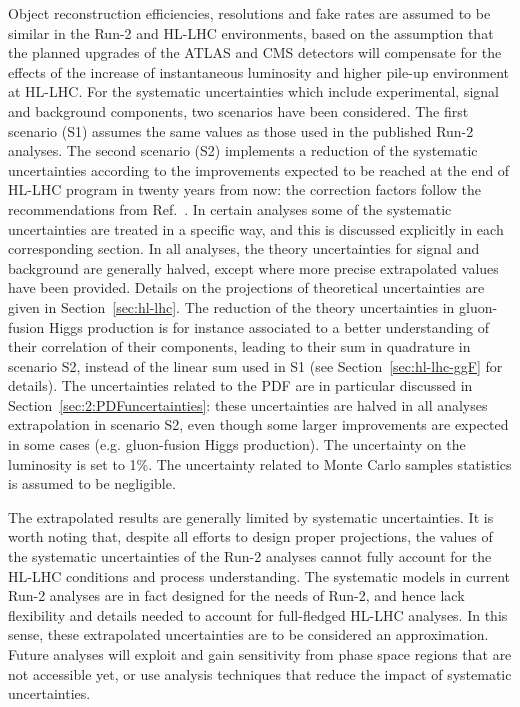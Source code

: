 Object reconstruction efficiencies, resolutions and fake rates are assumed to be similar in the Run-2 and HL-LHC environments, based on the assumption that the planned upgrades of the ATLAS and CMS detectors will compensate for the effects of the increase of instantaneous luminosity and higher pile-up environment at HL-LHC.
For the systematic uncertainties which include experimental, signal and background components, two scenarios have been considered.
The first scenario (S1) assumes the same values as those used in the published Run-2 analyses.
The second scenario (S2) implements a reduction of the systematic uncertainties according to the improvements expected to be reached at the end of HL-LHC program in twenty years from now: the correction factors follow the recommendations from Ref.~\cite{HLHELHCCommonSystematics}.
In certain analyses some of the systematic uncertainties are treated in a specific way, and this is discussed explicitly in each corresponding section.
%
In all analyses, the theory uncertainties for signal and background are generally halved, except where more precise extrapolated values have been provided. Details on the projections of theoretical uncertainties are given in Section~\ref{sec:hl-lhc}. The reduction of the theory uncertainties in gluon-fusion Higgs production is for instance associated to a better understanding of their correlation of their components, leading to their sum in quadrature in scenario S2, instead of the linear sum used in S1 (see Section~\ref{sec:hl-lhc-ggF} for details). The uncertainties related to the PDF are in particular discussed in Section~\ref{sec:2:PDFuncertainties}: these uncertainties are halved in all analyses extrapolation in scenario S2, even though some larger improvements are expected in some cases (e.g. gluon-fusion Higgs production).
%
The uncertainty on the luminosity is set to 1\%.
The uncertainty related to Monte Carlo samples statistics is assumed to be negligible.

The extrapolated results are generally limited by systematic uncertainties. It is worth noting that, despite all efforts to design proper projections, the values of the systematic uncertainties of the Run-2 analyses cannot fully account for the HL-LHC conditions and process understanding. The systematic models in current Run-2 analyses are in fact designed for the needs of Run-2, and hence lack flexibility and details needed to account for full-fledged HL-LHC analyses. In this sense, these extrapolated uncertainties are to be considered an approximation. Future analyses will exploit and gain sensitivity from phase space regions that are not accessible yet, or use analysis techniques that reduce the impact of systematic uncertainties.

